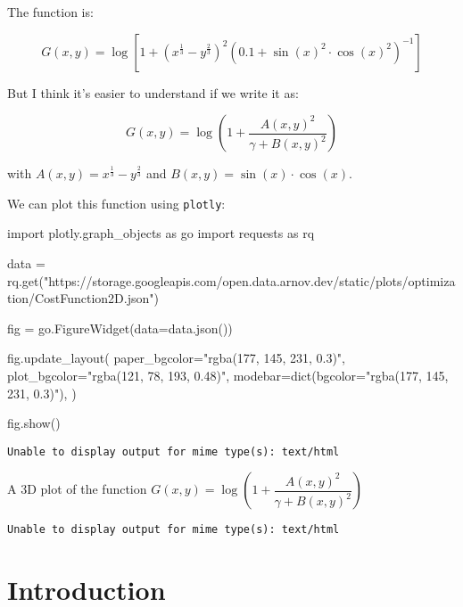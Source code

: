 \documentclass[
  letterpaper,
  DIV=11,
  numbers=noendperiod]{scrreprt}
\newenvironment{Shaded}{\begin{snugshade}}{\end{snugshade}}
\newcommand{\BuiltInTok}[1]{\textcolor[rgb]{0.00,0.23,0.31}{#1}}
\newcommand{\ImportTok}[1]{\textcolor[rgb]{0.00,0.46,0.62}{#1}}
\newcommand{\NormalTok}[1]{\textcolor[rgb]{0.00,0.23,0.31}{#1}}
\newcommand{\OperatorTok}[1]{\textcolor[rgb]{0.37,0.37,0.37}{#1}}
\newcommand{\StringTok}[1]{\textcolor[rgb]{0.13,0.47,0.30}{#1}}
\begin{document}
The function is:

\[G(x,y) = \log\left[1+\left(x^{\frac{1}{3}} - y^{\frac{2}{3}}\right)^2\left(0.1+\sin \left(x\right)^2\cdot \cos \left(x\right)^2\right)^{-1}\right]
\]

But I think it's easier to understand if we write it as:

\[ G(x,y) = \log\left(1 + \dfrac{A(x,y)^2}{\gamma + B(x,y)^2}\right)\]

with \(A(x,y) = x^{\frac{1}{3}} - y^{\frac{2}{3}}\) and
\(B(x,y) = \sin \left(x\right)\cdot \cos \left(x\right)\).

We can plot this function using \texttt{plotly}:

\begin{Shaded}
\begin{Highlighting}[]
\ImportTok{import}\NormalTok{ plotly.graph\_objects }\ImportTok{as}\NormalTok{ go}
\ImportTok{import}\NormalTok{ requests }\ImportTok{as}\NormalTok{ rq}

\NormalTok{data }\OperatorTok{=}\NormalTok{ rq.get(}\StringTok{"https://storage.googleapis.com/open.data.arnov.dev/static/plots/optimization/CostFunction2D.json"}\NormalTok{)}

\NormalTok{fig }\OperatorTok{=}\NormalTok{ go.FigureWidget(data}\OperatorTok{=}\NormalTok{data.json())}

\NormalTok{fig.update\_layout(}
\NormalTok{    paper\_bgcolor}\OperatorTok{=}\StringTok{"rgba(177, 145, 231, 0.3)"}\NormalTok{, plot\_bgcolor}\OperatorTok{=}\StringTok{"rgba(121, 78, 193, 0.48)"}\NormalTok{, modebar}\OperatorTok{=}\BuiltInTok{dict}\NormalTok{(bgcolor}\OperatorTok{=}\StringTok{"rgba(177, 145, 231, 0.3)"}\NormalTok{),}
\NormalTok{)}

\NormalTok{fig.show()}
\end{Highlighting}
\end{Shaded}

\begin{verbatim}
Unable to display output for mime type(s): text/html
\end{verbatim}

A 3D plot of the function
\(G(x,y) = \log\left(1 + \dfrac{A(x,y)^2}{\gamma + B(x,y)^2}\right)\)

\begin{verbatim}
Unable to display output for mime type(s): text/html
\end{verbatim}


\hypertarget{introduction}{%
\chapter{Introduction}\label{introduction}}
\end{document}
